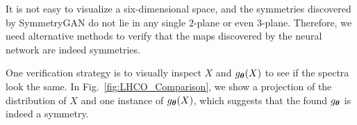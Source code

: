 \documentclass[aps,prx,reprint,preprintnumbers,superscriptaddress,nofootinbib,longbibliography,floatfix]{revtex4-1}
\DeclareRobustCommand{\Fig}[1]{Fig.~\ref{fig:#1}}
\begin{document}
It is not easy to visualize a six-dimensional space, and the symmetries discovered by SymmetryGAN
do not lie in any single $2$-plane or even $3$-plane.
%
Therefore, we need alternative methods to verify that the maps discovered by the neural network are indeed symmetries.


One verification strategy is to visually inspect $X$ and $g_{\vb*\theta}(X)$ to see if the spectra look the same.
%
In \Fig{LHCO_Comparison}, we show a projection of the distribution of $X$ and one instance of $g_{\vb*\theta}(X)$, which suggests that the found $g_{\vb*\theta}$ is indeed a symmetry.

\begin{figure*}[t]
    \centering
    $\quad$
    \caption{
An example of the jet azimuthal angle distributions, (i)$\widetilde{\phi}_{1}$ and (ii)$\widetilde{\phi}_{2}$, of the LHC Olympics dijet data rotated by a randomly selected rotation in $SO(4)$.
%
The distribution is not uniform, so a random rotation is not a symmetry.}
    \label{fig:KL_rand}
\end{figure*}

\begin{figure*}[t]
    \centering
    $\quad$
    \caption{
    The same as \Fig{KL_rand}, but for a symmetry in $SO(4)$.
    The distribution is uniform, so this rotation is a candidate symmetry.
    }
    \label{fig:KL_symm}
\end{figure*}
\end{document}
